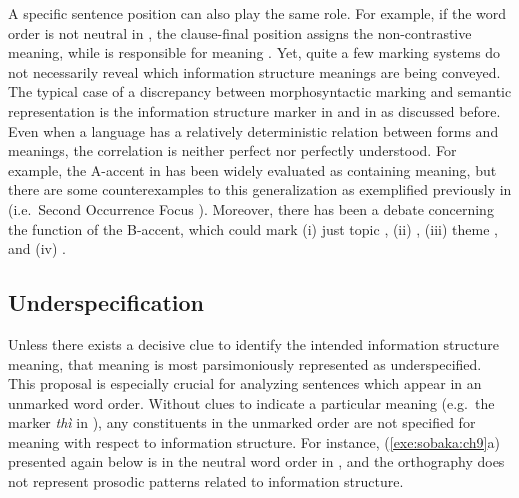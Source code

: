 \noindent A specific sentence position can also play the same
role. For example, if the word order is not neutral in ,
the clause-final position assigns the non-contrastive 
meaning, while  is responsible for
 meaning \citep{neeleman:titov:09}. Yet, quite a few
marking systems do not necessarily reveal which information structure
meanings are being conveyed. The typical case of a discrepancy between
morphosyntactic marking and semantic representation is the information
structure marker \wa in  and \nun in  as
discussed before. Even when a language has a relatively deterministic
relation between forms and meanings, the correlation is neither
perfect nor perfectly understood. For example, the A-accent in
 has been widely evaluated as containing  meaning,
but there are some counterexamples to this generalization as
exemplified previously in  (i.e.\ Second
Occurrence Focus ). Moreover, there has
been a debate concerning the function of the B-accent, which could
mark (i) just topic \citep{jackendoff:72}, (ii) 
\citep{kadmon:01,buring:03}, (iii) theme \citep{steedman:00}, and (iv)
 \citep{hedberg:06}.




\subsection{Underspecification}
\label{9:ssec:underspecification}

Unless there exists a decisive clue to identify the intended
information structure meaning, that meaning is most parsimoniously
represented as underspecified.
This proposal is especially crucial for
analyzing sentences which appear in an unmarked word order.  Without
clues to indicate a particular meaning (e.g.\ the 
marker \textit{th{\`i}} in ), any constituents in the
unmarked order are not specified for meaning with respect to
information structure. For instance, (\ref{exe:sobaka:ch9}a) presented
again below is in the neutral word order in , and the
orthography does not represent prosodic patterns related to
information structure.




